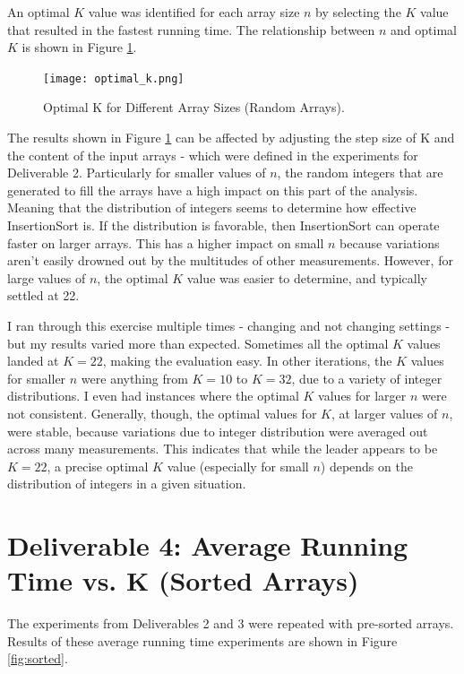 \documentclass{article}
\begin{document}
An optimal \( K \) value was identified for each array size \( n \) by selecting the \( K \) value that resulted in the fastest running time. The relationship between \( n \) and optimal \( K \) is shown in Figure \ref{fig:optimal_k}.
	
\begin{figure}[h!]
    \centering
    \texttt{[image: optimal\_k.png]}
    \caption{Optimal K for Different Array Sizes (Random Arrays).}
    \label{fig:optimal_k}
\end{figure}

The results shown in Figure \ref{fig:optimal_k} can be affected by adjusting the step size of K and the content of the input arrays - which were defined in the experiments for Deliverable 2. Particularly for smaller values of $n$, the random integers that are generated to fill the arrays have a high impact on this part of the analysis. Meaning that the distribution of integers seems to determine how effective InsertionSort is. If the distribution is favorable, then InsertionSort can operate faster on larger arrays. This has a higher impact on small $n$ because variations aren't easily drowned out by the multitudes of other measurements. However, for large values of $n$, the optimal $K$ value was easier to determine, and typically settled at 22. 

I ran through this exercise multiple times - changing and not changing settings - but my results varied more than expected. Sometimes all the optimal $K$ values landed at $K= 22$, making the evaluation easy. In other iterations, the $K$ values for smaller $n$ were anything from $K= 10$ to $K = 32$, due to a variety of integer distributions. I even had instances where the optimal $K$ values for larger $n$ were not consistent. Generally, though, the optimal values for $K$, at larger values of $n$, were stable, because variations due to integer distribution were averaged out across many measurements. This indicates that while the leader appears to be $K=22$, a precise optimal $K$ value (especially for small $n$) depends on the distribution of integers in a given situation. 

\section*{Deliverable 4: Average Running Time vs. K (Sorted Arrays)}
	
The experiments from Deliverables 2 and 3 were repeated with pre-sorted arrays. Results of these average running time experiments are shown in Figure \ref{fig:sorted}.
	
\end{document}
